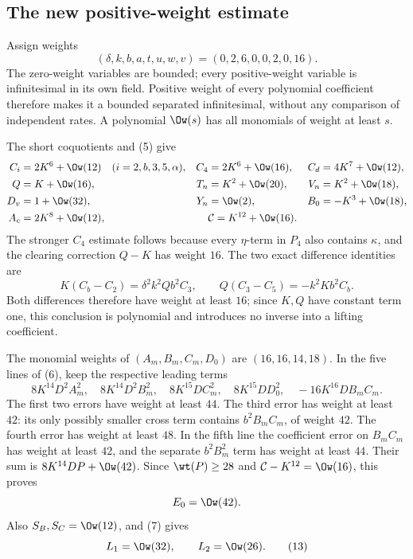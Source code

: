 \subsection{The new positive-weight estimate}

Assign weights
\begin{equation}
 (\delta,k,b,a,t,u,w,v)=(0,2,6,0,0,2,0,16).             \tag{12}
\end{equation}
The zero-weight variables are bounded; every positive-weight variable
is infinitesimal in its own field. Positive weight of every polynomial
coefficient therefore makes it a bounded separated infinitesimal,
without any comparison of independent rates. A polynomial
$\Ow(s)$ has all monomials of weight at least $s$.

The short coquotients and (5) give
\begin{align*}
 C_i&=2K^6+\Ow(12)\quad(i=2,b,3,5,\alpha),&
 C_4&=2K^6+\Ow(16),& C_d&=4K^7+\Ow(12),\\
 Q&=K+\Ow(16),& T_n&=K^2+\Ow(20),& V_n&=K^2+\Ow(18),\\
 D_v&=1+\Ow(32),&Y_n&=\Ow(2),&B_0&=-K^3+\Ow(18),\\
 A_c&=2K^8+\Ow(12),&&\mathcal C=K^{12}+\Ow(16).
\end{align*}
The stronger $C_4$ estimate follows because every $\eta$-term in
$P_4$ also contains $\kappa$, and the clearing correction $Q-K$
has weight $16$. The two exact difference identities are
\[
 K(C_b-C_2)=\delta^2k^2Qb^2C_3,\qquad
 Q(C_3-C_5)=-k^2Kb^2C_b.
\]
Both differences therefore have weight at least $16$; since $K,Q$
have constant term one, this conclusion is polynomial and introduces
no inverse into a lifting coefficient.

The monomial weights of $(A_m,B_m,C_m,D_0)$ are $(16,16,14,18)$.
In the five lines of (6), keep the respective leading terms
\[
 8K^{14}D^2A_m^2,\quad 8K^{14}D^2B_m^2,\quad
 8K^{15}DC_m^2,\quad 8K^{15}DD_0^2,\quad
 -16K^{16}DB_mC_m.
\]
The first two errors have weight at least $44$. The third error has
weight at least $42$: its only possibly smaller cross term contains
$b^2B_mC_m$, of weight $42$. The fourth error has weight at least
$48$. In the fifth line the coefficient error on $B_mC_m$ has weight
at least $42$, and the separate $b^2B_m^2$ term has weight at least
$44$. Their sum is $8K^{14}DP+\Ow(42)$. Since $\wt(P)\geq28$
and $\mathcal C-K^{12}=\Ow(16)$, this proves
\[
 E_0=\Ow(42).
\]
Also $S_B,S_C=\Ow(12)$, and (7) gives
\begin{equation}
 L_1=\Ow(32),\qquad L_2=\Ow(26).                       \tag{13}
\end{equation}

